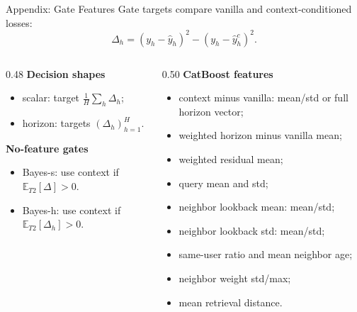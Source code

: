 \begin{frame}{Appendix: Gate Features}
  \scriptsize
  Gate targets compare vanilla and context-conditioned losses:
  \[
    \Delta_h=(y_h-\hat y_h)^2-(y_h-\hat y^c_h)^2.
  \]

  \begin{columns}[T,onlytextwidth]
    \begin{column}{0.48\textwidth}
      \textbf{Decision shapes}
      \begin{itemize}
        \item scalar: target $\frac{1}{H}\sum_h\Delta_h$;
        \item horizon: targets $(\Delta_h)_{h=1}^H$.
      \end{itemize}

      \textbf{No-feature gates}
      \begin{itemize}
        \item Bayes-s: use context if $\mathbb{E}_{T2}[\Delta]>0$.
        \item Bayes-h: use context if $\mathbb{E}_{T2}[\Delta_h]>0$.
      \end{itemize}
    \end{column}
    \begin{column}{0.50\textwidth}
      \textbf{CatBoost features}
      \begin{itemize}
        \item context minus vanilla: mean/std or full horizon vector;
        \item weighted horizon minus vanilla mean;
        \item weighted residual mean;
        \item query mean and std;
        \item neighbor lookback mean: mean/std;
        \item neighbor lookback std: mean/std;
        \item same-user ratio and mean neighbor age;
        \item neighbor weight std/max;
        \item mean retrieval distance.
      \end{itemize}
    \end{column}
  \end{columns}
\end{frame}

\PrintBibliography
